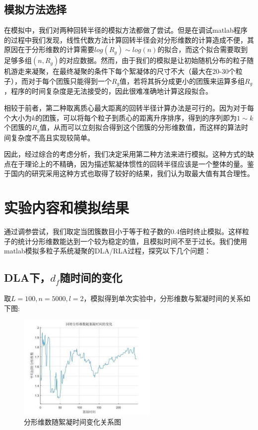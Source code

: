 \documentclass[lang=cn,11pt,a4paper,cite=authoryear]{elegantpaper}
\begin{document}
\subsection{模拟方法选择}
在模拟中，我们对两种回转半径的模拟方法都做了尝试。但是在调试matlab程序的过程中我们发现，线性代数方法计算回转半径会对分形维数的计算造成不便，其原因在于分形维数的计算需要$log(R_g)\sim log(n)$的拟合，而这个拟合需要取到足够多组$(n, R_g)$的对应数据。然而，由于我们的模拟是让初始随机分布的粒子随机游走来凝聚，在最终凝聚的条件下每个絮凝体的尺寸不大（最大在20-30个粒子），而对于每个团簇只能得到一个$R_g$值，若将其拆分成更小的团簇来运算多组$R_g$，程序的时间复杂度是无法接受的，因此很难准确地计算这段拟合。

相较于前者，第二种取离质心最大距离的回转半径计算办法是可行的。因为对于每个大小为$k$的团簇，可以将每个粒子到质心的距离升序排序，得到的序列即为$1\sim k$个团簇的$R_g$值，从而可以立刻拟合得到这个团簇的分形维数值，而这样的算法时间复杂度不高且实现较简单。

因此，经过综合的考虑分析，我们决定采用第二种方法来进行模拟。这种方式的缺点在于理论上的不精确，因为描述絮凝体惯性的回转半径应该是一个整体的量。鉴于国内的研究采用这种方式也取得了较好的结果，我们认为取最大值有其合理性。

\section{实验内容和模拟结果}
通过调参尝试，我们取定当团簇数目小于等于粒子数的0.4倍时终止模拟。这样粒子的统计分形维数能达到一个较为稳定的值，且模拟时间不至于过长。我们使用matlab模拟多粒子系统凝聚的DLA/RLA过程，探究以下几个问题：
\subsection{DLA下，$d_f$随时间的变化}
取$L = 100, n = 5000, l = 2$，模拟得到单次实验中，分形维数与絮凝时间的关系如下图:
\begin{figure}[htbp]
    \centering
    \includegraphics[width=0.6\textwidth]{results/time.png}
    \caption{分形维数随絮凝时间变化关系图}
\end{figure}
\end{document}
